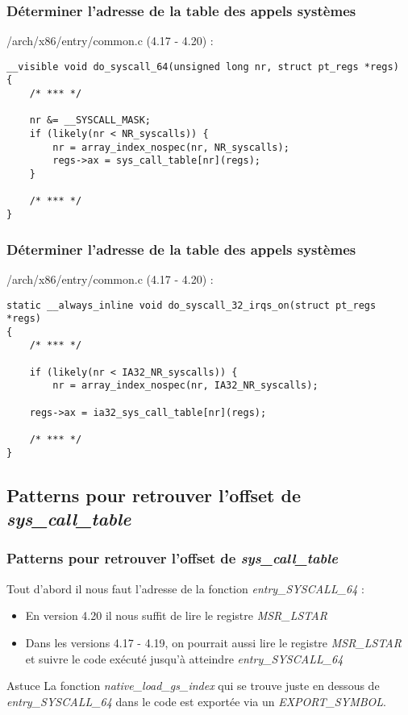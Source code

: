 \documentclass{beamer}
\begin{document}
\begin{frame}[fragile]
\frametitle{Déterminer l'adresse de la table des appels systèmes}
/arch/x86/entry/common.c (4.17 - 4.20) :
\begin{lstlisting}[style=CStyle]
__visible void do_syscall_64(unsigned long nr, struct pt_regs *regs)
{
	/* *** */

	nr &= __SYSCALL_MASK;
	if (likely(nr < NR_syscalls)) {
		nr = array_index_nospec(nr, NR_syscalls);
		regs->ax = sys_call_table[nr](regs);
	}

	/* *** */
}
\end{lstlisting}
\end{frame}

\begin{frame}[fragile]
\frametitle{Déterminer l'adresse de la table des appels systèmes}
/arch/x86/entry/common.c (4.17 - 4.20) :
\begin{lstlisting}[style=CStyle]
static __always_inline void do_syscall_32_irqs_on(struct pt_regs *regs)
{
	/* *** */

	if (likely(nr < IA32_NR_syscalls)) {
		nr = array_index_nospec(nr, IA32_NR_syscalls);

	regs->ax = ia32_sys_call_table[nr](regs);

	/* *** */
}
\end{lstlisting}
\end{frame}

\subsection{Patterns pour retrouver l'offset de \textit{sys\_call\_table}}

\begin{frame}[fragile]
\frametitle{Patterns pour retrouver l'offset de \textit{sys\_call\_table}}
Tout d'abord il nous faut l'adresse de la fonction \textit{entry\_SYSCALL\_64} :
\begin{itemize}
\item 	En version 4.20 il nous suffit de lire le registre \textit{MSR\_LSTAR}
\item 	Dans les versions 4.17 - 4.19, on pourrait aussi lire le registre \textit{MSR\_LSTAR} et suivre le code exécuté jusqu'à atteindre \textit{entry\_SYSCALL\_64}
\end{itemize}
\begin{block}{Astuce}
La fonction \textit{native\_load\_gs\_index} qui se trouve juste en dessous de \textit{entry\_SYSCALL\_64} dans le code est exportée via un \textit{EXPORT\_SYMBOL}.
\end{block}
\end{frame}
\end{document}
